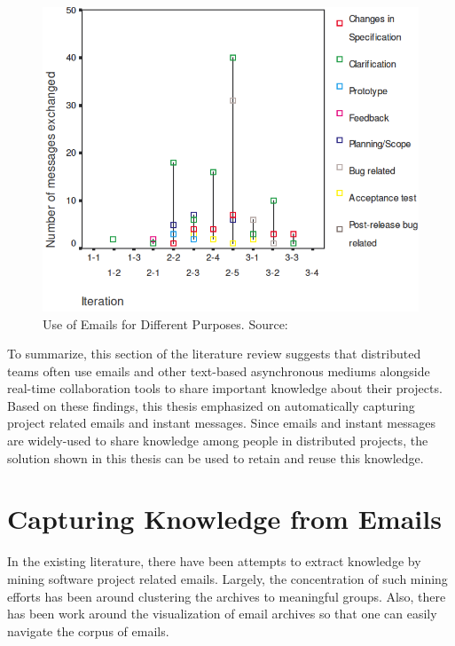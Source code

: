 \begin{figure}[bt]
	\centering
	\includegraphics[width=\textwidth]{Layman.png}
    \caption{Use of Emails for Different Purposes. Source: \cite{essential_communication}}
	\label{fig:layman}
\end{figure}

To summarize, this section of the literature review suggests that distributed teams often use emails and other text-based asynchronous mediums alongside real-time collaboration tools to share important knowledge about their projects. Based on these findings, this thesis emphasized on automatically capturing project related emails and instant messages. Since emails and instant messages are widely-used to share knowledge among people in distributed projects, the solution shown in this thesis can be used to retain and reuse this knowledge.

\section{Capturing Knowledge from Emails}
In the existing literature, there have been attempts to extract knowledge by mining software project related emails. Largely, the concentration of such mining efforts has been around clustering the archives to meaningful groups. Also, there has been work around the visualization of email archives so that one can easily navigate the corpus of emails.


